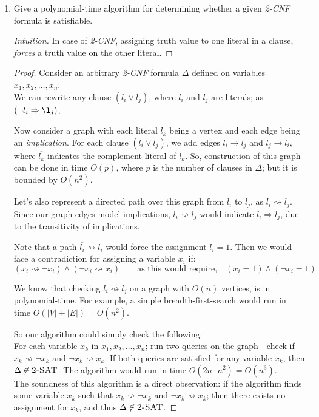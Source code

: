 \documentclass[usletter]{article}
\newcommand {\namedlangset}[1] {\ensuremath{\textnormal{\textsc{#1}}}}
\newcommand {\term}[1]      {\textit{#1}}
\begin{document}
\begin{enumerate}[labelsep=2.5em, label=\textbf{\arabic{enumi}}]
\item Give a polynomial-time algorithm for determining whether a given
      \term{2-CNF} formula is satisfiable.
  \begin{proof}[Intuition]
    In case of \term{2-CNF}, assigning truth value to one literal in a
    clause, \textit{forces} a truth value on the other literal.
  \end{proof}
  \begin{proof}
    Consider an arbitrary \term{2-CNF} formula $\Delta$ defined on variables
    $x_1, x_2, \ldots, x_n$. \\
    We can rewrite any clause $(l_i \vee l_j)$, where $l_i$ and $l_j$ are
    literals; as $(\neg l_i \Rightarrow \l_j)$.

    Now consider a graph with each literal $l_k$ being a vertex and each edge
    being an \textit{implication}. For each clause $(l_i \vee l_j)$, we add
    edges $\overline{l_i} \longrightarrow l_j$ and
    $\overline{l_j} \longrightarrow l_i$, where $\overline{l_k}$ indicates the
    complement literal of $l_k$. So, construction of this graph can be done in
    time $O(p)$, where $p$ is the number of clauses in $\Delta$; but it is
    bounded by $O(n^2)$.

    Let's also represent a directed path over this graph from $l_i$ to $l_j$, as
    $l_i \rightsquigarrow l_j$. Since our graph edges model implications,
    $l_i \rightsquigarrow l_j$ would indicate $l_i \Rightarrow l_j$, due to the
    transitivity of implications.

    Note that a path $\overline{l_i} \rightsquigarrow l_i$ would force the
    assignment $l_i = 1$. Then we would face a contradiction for assigning a
    variable $x_i$ if:
    $$
      (x_i \rightsquigarrow \neg x_i) \wedge (\neg x_i \rightsquigarrow x_i)
      \qquad \text{as this would require,}
      \quad (x_i = 1) \wedge (\neg x_i = 1)
    $$

    We know that checking $l_i \rightsquigarrow l_j$ on a graph with $O(n)$
    vertices, is in polynomial-time. For example, a simple breadth-first-search
    would run in time $O(|V|+|E|) = O(n^2)$.

    So our algorithm could simply check the following: \\
    For each variable $x_k$ in $x_1, x_2, \ldots, x_n$; run two queries on the
    graph - check if $x_k \rightsquigarrow \neg x_k$ and
    $\neg x_k \rightsquigarrow x_k$. If both queries are satisfied for any
    variable $x_k$, then $\Delta \not\in \namedlangset{2-SAT}$. The algorithm
    would run in time $O(2 n \cdot n^2) = O(n^3)$. \\
    The soundness of this algorithm is a direct observation: if the algorithm
    finds some variable $x_k$ such that $x_k \rightsquigarrow \neg x_k$ and
    $\neg x_k \rightsquigarrow x_k$; then there exists no assignment for $x_k$,
    and thus $\Delta \not\in \namedlangset{2-SAT}$.


\end{proof}
\end{enumerate}
\end{document}
